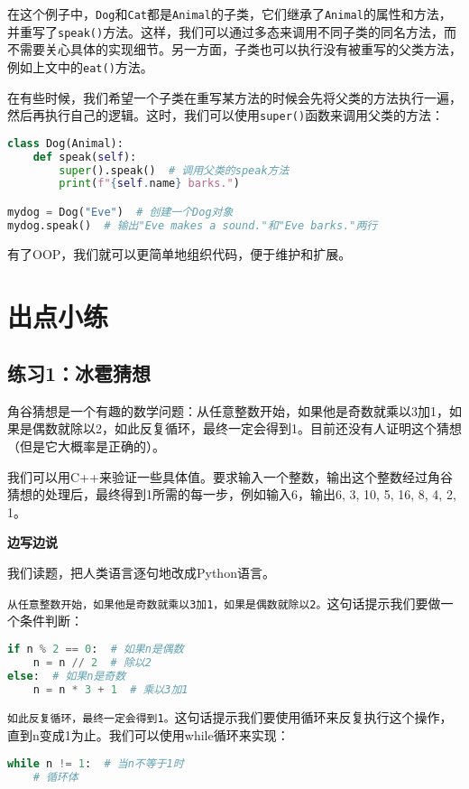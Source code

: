 \documentclass[../main.tex]{subfiles}
\begin{document}
在这个例子中，\texttt{Dog}和\texttt{Cat}都是\texttt{Animal}的子类，它们继承了\texttt{Animal}的属性和方法，并重写了\texttt{speak()}方法。这样，我们可以通过多态来调用不同子类的同名方法，而不需要关心具体的实现细节。另一方面，子类也可以执行没有被重写的父类方法，例如上文中的\texttt{eat()}方法。

在有些时候，我们希望一个子类在重写某方法的时候会先将父类的方法执行一遍，然后再执行自己的逻辑。这时，我们可以使用\texttt{super()}函数来调用父类的方法：
\begin{lstlisting}[language=python]
class Dog(Animal):
    def speak(self):
        super().speak()  # 调用父类的speak方法
        print(f"{self.name} barks.")

mydog = Dog("Eve")  # 创建一个Dog对象
mydog.speak()  # 输出"Eve makes a sound."和"Eve barks."两行
\end{lstlisting}

有了OOP，我们就可以更简单地组织代码，便于维护和扩展。

\section{出点小练}

\subsection{练习1：冰雹猜想}

角谷猜想是一个有趣的数学问题：从任意整数开始，如果他是奇数就乘以3加1，如果是偶数就除以2，如此反复循环，最终一定会得到1。目前还没有人证明这个猜想（但是它大概率是正确的）。

我们可以用C++来验证一些具体值。要求输入一个整数，输出这个整数经过角谷猜想的处理后，最终得到1所需的每一步，例如输入6，输出6, 3, 10, 5, 16, 8, 4, 2, 1。

\textbf{边写边说}

我们读题，把人类语言逐句地改成Python语言。

\texttt{从任意整数开始，如果他是奇数就乘以3加1，如果是偶数就除以2。}这句话提示我们要做一个条件判断：
\begin{lstlisting}[language=python]
if n % 2 == 0:  # 如果n是偶数
    n = n // 2  # 除以2
else:  # 如果n是奇数
    n = n * 3 + 1  # 乘以3加1
\end{lstlisting}
\texttt{如此反复循环，最终一定会得到1。}这句话提示我们要使用循环来反复执行这个操作，直到n变成1为止。我们可以使用while循环来实现：
\begin{lstlisting}[language=python]
while n != 1:  # 当n不等于1时
    # 循环体
\end{lstlisting}
\end{document}
